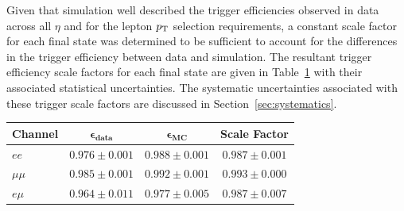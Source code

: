 Given that simulation well described the trigger efficiencies observed in data across all $\eta$ and for the lepton $p_{\mathrm{T}}$ selection requirements, a constant scale factor for each final state was determined to be sufficient to account for the differences in the trigger efficiency between data and simulation.
The resultant trigger efficiency scale factors for each final state are given in Table~\ref{tab:triggerSFs} with their associated statistical uncertainties.
The systematic uncertainties associated with these trigger scale factors are discussed in Section~\ref{sec:systematics}.

\begin{table}[htbp]
\label{tab:triggerSFs}
  \centering
 \begin{tabular}{lccc}
   \hline
   \textbf{Channel} & $\bm{\epsilon _{data}}$ & $\bm{\epsilon _{MC}}$ & \textbf{Scale Factor}\\
   \hline   
   $ee$ & $0.976 \pm 0.001 $& $0.988 \pm 0.001$ & $0.987 \pm 0.001$  \\
   $\mu\mu$ & $0.985 \pm 0.001$ & $0.992 \pm 0.001$ & $0.993 \pm 0.000$  \\
   $e \mu$ & $0.964 \pm 0.011$ & $0.977 \pm 0.005$ & $0.987 \pm 0.007 $ \\
   \hline
 \end{tabular}%
\end{table}




